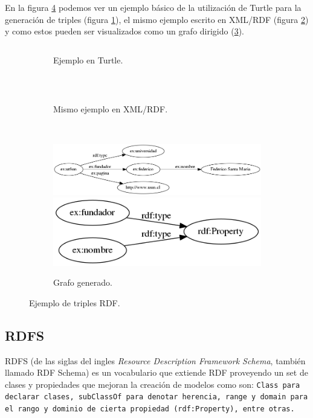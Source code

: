 En la figura \ref{fig:triples} podemos ver un ejemplo básico de la utilización 
de Turtle para la generación de triples (figura \ref{fig:triples:ttl}), el
mismo ejemplo escrito en XML/RDF (figura \ref{fig:triples:rdf}) y como estos
pueden ser visualizados como un grafo dirigido (\ref{fig:triples:grafo}).
\begin{figure}[htpb]
  \centering
  \begin{subfigure}[b]{\textwidth}
    \centering
    \begin{tabular}{c}
      
    \end{tabular}
    \caption{Ejemplo en Turtle.}
    \label{fig:triples:ttl}
  \end{subfigure}
  \\[0.5cm]
  \begin{subfigure}[b]{\textwidth}
    \centering
    \begin{tabular}{c}
      
    \end{tabular}
    \caption{Mismo ejemplo en XML/RDF.}
    \label{fig:triples:rdf}
  \end{subfigure}
  \\[0.5cm]
  \begin{subfigure}[]{\textwidth}
    \centering
    \includegraphics[width=\textwidth]{figures/example-rdf_graph-1.png}
    \includegraphics[width=.5\textwidth]{figures/example-rdf_graph-2.png}
    \caption{Grafo generado.}
    \label{fig:triples:grafo}
  \end{subfigure}
  \caption{Ejemplo de triples RDF.}\label{fig:triples}
\end{figure}

\subsection{RDFS}
RDFS (de las siglas del ingles \emph{Resource Description Framework Schema},
también llamado RDF Schema) es un vocabulario que extiende RDF proveyendo un
set de clases y propiedades que mejoran la creación de modelos como son:
\tt{Class} para declarar clases, \tt{subClassOf} para denotar herencia,
\tt{range} y \tt{domain} para el rango y dominio de cierta propiedad
(\tt{rdf:Property}), entre otras.

